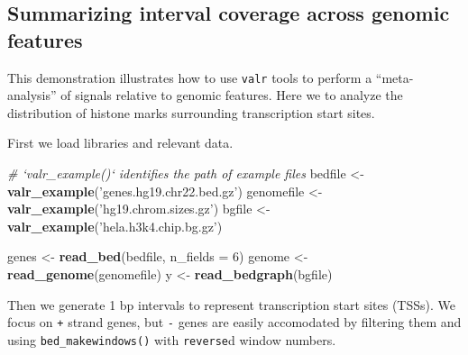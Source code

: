 \documentclass[9pt,a4paper]{extarticle}
\renewcommand{\KeywordTok}[1]{\textbf{{#1}}}
\renewcommand{\DataTypeTok}[1]{\textcolor[rgb]{0.50,0.00,0.00}{{#1}}}
\renewcommand{\DecValTok}[1]{\textcolor[rgb]{0.00,0.00,1.00}{{#1}}}
\renewcommand{\StringTok}[1]{\textcolor[rgb]{0.87,0.00,0.00}{{#1}}}
\renewcommand{\CommentTok}[1]{\textcolor[rgb]{0.50,0.50,0.50}{\textit{{#1}}}}
\renewcommand{\NormalTok}[1]{{#1}}
\begin{document}
\subsection*{Summarizing interval coverage across genomic features}

This demonstration illustrates how to use \texttt{valr} tools to perform
a ``meta-analysis'' of signals relative to genomic features. Here we to
analyze the distribution of histone marks surrounding transcription
start sites.

First we load libraries and relevant data.

\begin{Highlighting}[]
\CommentTok{# `valr_example()` identifies the path of example files}
\NormalTok{bedfile <-}\StringTok{ }\KeywordTok{valr_example}\NormalTok{(}\StringTok{'genes.hg19.chr22.bed.gz'}\NormalTok{)}
\NormalTok{genomefile <-}\StringTok{ }\KeywordTok{valr_example}\NormalTok{(}\StringTok{'hg19.chrom.sizes.gz'}\NormalTok{)}
\NormalTok{bgfile  <-}\StringTok{ }\KeywordTok{valr_example}\NormalTok{(}\StringTok{'hela.h3k4.chip.bg.gz'}\NormalTok{)}

\NormalTok{genes <-}\StringTok{ }\KeywordTok{read_bed}\NormalTok{(bedfile, }\DataTypeTok{n_fields =} \DecValTok{6}\NormalTok{)}
\NormalTok{genome <-}\StringTok{ }\KeywordTok{read_genome}\NormalTok{(genomefile)}
\NormalTok{y <-}\StringTok{ }\KeywordTok{read_bedgraph}\NormalTok{(bgfile)}
\end{Highlighting}

Then we generate 1 bp intervals to represent transcription start sites
(TSSs). We focus on \texttt{+} strand genes, but \texttt{-} genes are
easily accomodated by filtering them and using
\texttt{bed\_makewindows()} with \texttt{reverse}d window numbers.
\end{document}
